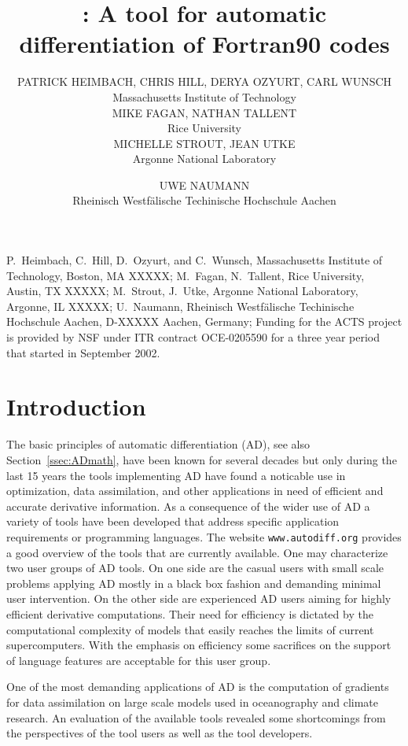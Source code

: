 \documentclass[acmtocl,acmnow]{acmtrans2m}
\title{\OpenAD: A tool for automatic differentiation 
of Fortran90 codes}
\author{PATRICK HEIMBACH, CHRIS HILL, DERYA OZYURT, CARL WUNSCH\\Massachusetts Institute of Technology\\
MIKE FAGAN, NATHAN TALLENT \\Rice University\\
MICHELLE STROUT, JEAN UTKE \\Argonne National Laboratory 
\and
UWE NAUMANN\\Rheinisch Westf\"alische Techinische Hochschule Aachen}
\newcommand{\refsec}[1]{Section~\ref{#1}}
\begin{document}
\begin{bottomstuff} 
P.~Heimbach, C.~Hill, D.~Ozyurt, and C.~Wunsch, Massachusetts Institute of Technology, 
Boston, MA XXXXX;\newline
M.~Fagan, N.~Tallent, Rice University, 
Austin, TX XXXXX;\newline
M.~Strout, J.~Utke, Argonne National Laboratory, 
Argonne, IL XXXXX;\newline
U.~Naumann, Rheinisch Westf\"alische Techinische Hochschule Aachen, 
D-XXXXX Aachen, Germany;\newline
Funding for the ACTS project is provided by NSF under ITR contract OCE-0205590
for a three year period that started in September 2002.
\end{bottomstuff}
\maketitle

\section{Introduction} \label{sec:Introduction}

The basic principles of automatic differentiation (AD), see also \refsec{ssec:ADmath}, 
have been known for several decades \cite{wengert}
but only during the last 15 years the tools implementing AD have found a noticable use in 
optimization, data assimilation, and other applications in need of efficient and accurate 
derivative information. 
As a consequence of the wider use of AD 
a variety of tools have been developed that address specific 
application requirements or programming languages. 
The website {\tt www.autodiff.org} provides a good overview of the tools that 
are currently available. 
One may characterize two user groups of AD tools. On one side are the casual users 
with small scale problems applying AD mostly in a black box fashion and demanding 
minimal user intervention. 
On the other side are experienced AD users aiming for highly efficient 
derivative computations. Their need for efficiency is dictated by the 
computational complexity of models that easily reaches the limits of  current 
supercomputers. With the emphasis on efficiency some sacrifices on the support of 
language features are acceptable for this user group. 

One of the most demanding applications of AD is the computation of gradients for 
data assimilation on large scale models used in oceanography and climate research. 
An evaluation of the available tools revealed some shortcomings from the perspectives 
of the tool users as well as the tool developers. 
\end{document}
